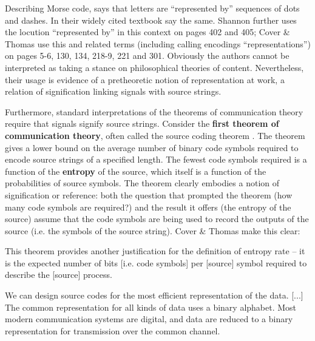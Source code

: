\documentclass[12pt]{article}
\begin{document}
Describing Morse code, \citet[385]{shannon1948mathematicalc} says that letters are ``represented by'' sequences of dots and dashes.
In their widely cited textbook \citet[105]{cover2006elements} say the same.
Shannon further uses the locution ``represented by'' in this context on pages 402 and 405; Cover \& Thomas use this and related terms (including calling encodings ``representations'') on pages 5-6, 130, 134, 218-9, 221 and 301.
Obviously the authors cannot be interpreted as taking a stance on philosophical theories of content.
Nevertheless, their usage is evidence of a pretheoretic notion of representation at work, a relation of signification linking signals with source strings.

Furthermore, standard interpretations of the theorems of communication theory require that signals signify source strings.
Consider the \textbf{first theorem of communication theory}, often called the source coding theorem \citep[$\S$5]{cover2006elements} \citep[$\S$4]{mackay2003information}.
The theorem gives a lower bound on the average number of binary code symbols required to encode source strings of a specified length.
The fewest code symbols required is a function of the \textbf{entropy} of the source, which itself is a function of the probabilities of source symbols.
The theorem clearly embodies a notion of signification or reference: both the question that prompted the theorem (how many code symbols are required?) and the result it offers (the entropy of the source) assume that the code symbols are being used to record the outputs of the source (i.e. the symbols of the source string).
Cover \& Thomas make this clear:

\begin{myquote}
This theorem provides another justification for the definition of entropy rate -- it is the expected number of bits [i.e. code symbols] per [source] symbol required to describe the [source] process.
\par\hspace*{\fill}\citet[115]{cover2006elements}
\end{myquote}

\begin{myquote}
We can design source codes for the most efficient representation of the data. [...] The common representation for all kinds of data uses a binary alphabet. Most modern communication systems are digital, and data are reduced to a binary representation for transmission over the common channel.
\par\hspace*{\fill}\citet[218]{cover2006elements}
\end{myquote}
\end{document}
